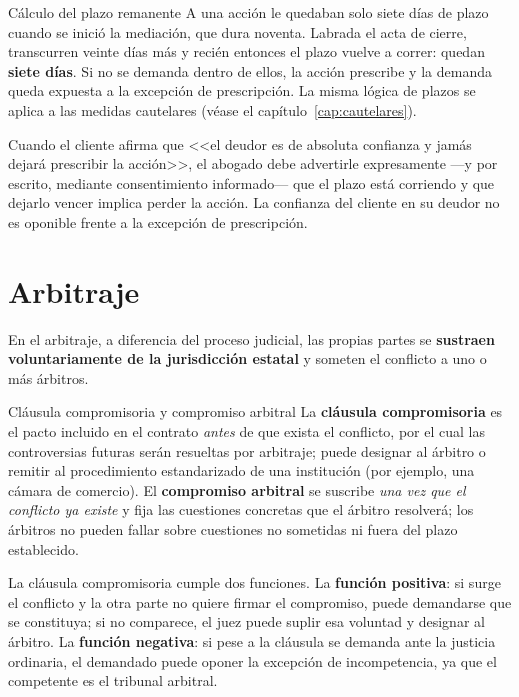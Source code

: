 \documentclass[12pt,oneside]{book}
\begin{document}
\begin{example}{Cálculo del plazo remanente}
A una acción le quedaban solo siete días de plazo cuando se inició la mediación, que dura noventa. Labrada el acta de cierre, transcurren veinte días más y recién entonces el plazo vuelve a correr: quedan \textbf{siete días}. Si no se demanda dentro de ellos, la acción prescribe y la demanda queda expuesta a la excepción de prescripción. La misma lógica de plazos se aplica a las medidas cautelares (véase el capítulo~\ref{cap:cautelares}).
\end{example}

\begin{important}
Cuando el cliente afirma que <<el deudor es de absoluta confianza y jamás dejará prescribir la acción>>, el abogado debe advertirle expresamente ---y por escrito, mediante consentimiento informado--- que el plazo está corriendo y que dejarlo vencer implica perder la acción. La confianza del cliente en su deudor no es oponible frente a la excepción de prescripción.
\end{important}

\section{Arbitraje}

En el arbitraje, a diferencia del proceso judicial, las propias partes se \textbf{sustraen voluntariamente de la jurisdicción estatal} y someten el conflicto a uno o más árbitros.

\begin{definition}{Cláusula compromisoria y compromiso arbitral}
La \textbf{cláusula compromisoria} es el pacto incluido en el contrato \emph{antes} de que exista el conflicto, por el cual las controversias futuras serán resueltas por arbitraje; puede designar al árbitro o remitir al procedimiento estandarizado de una institución (por ejemplo, una cámara de comercio). El \textbf{compromiso arbitral} se suscribe \emph{una vez que el conflicto ya existe} y fija las cuestiones concretas que el árbitro resolverá; los árbitros no pueden fallar sobre cuestiones no sometidas ni fuera del plazo establecido.
\end{definition}

La cláusula compromisoria cumple dos funciones. La \textbf{función positiva}: si surge el conflicto y la otra parte no quiere firmar el compromiso, puede demandarse que se constituya; si no comparece, el juez puede suplir esa voluntad y designar al árbitro. La \textbf{función negativa}: si pese a la cláusula se demanda ante la justicia ordinaria, el demandado puede oponer la excepción de incompetencia, ya que el competente es el tribunal arbitral.
\end{document}
